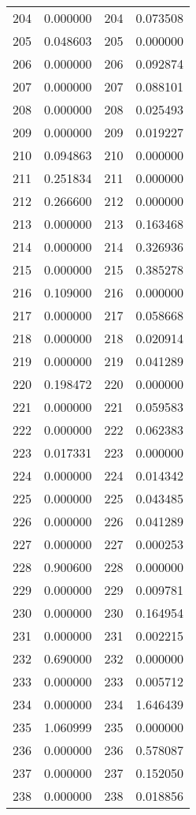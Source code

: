 \documentclass[12pt]{article}
\begin{document}
\begin{longtable}{@{}cccc@{}}
204 & 0.000000 & 204 & 0.073508 \\
205 & 0.048603 & 205 & 0.000000 \\
206 & 0.000000 & 206 & 0.092874 \\
207 & 0.000000 & 207 & 0.088101 \\
208 & 0.000000 & 208 & 0.025493 \\
209 & 0.000000 & 209 & 0.019227 \\
210 & 0.094863 & 210 & 0.000000 \\
211 & 0.251834 & 211 & 0.000000 \\
212 & 0.266600 & 212 & 0.000000 \\
213 & 0.000000 & 213 & 0.163468 \\
214 & 0.000000 & 214 & 0.326936 \\
215 & 0.000000 & 215 & 0.385278 \\
216 & 0.109000 & 216 & 0.000000 \\
217 & 0.000000 & 217 & 0.058668 \\
218 & 0.000000 & 218 & 0.020914 \\
219 & 0.000000 & 219 & 0.041289 \\
220 & 0.198472 & 220 & 0.000000 \\
221 & 0.000000 & 221 & 0.059583 \\
222 & 0.000000 & 222 & 0.062383 \\
223 & 0.017331 & 223 & 0.000000 \\
224 & 0.000000 & 224 & 0.014342 \\
225 & 0.000000 & 225 & 0.043485 \\
226 & 0.000000 & 226 & 0.041289 \\
227 & 0.000000 & 227 & 0.000253 \\
228 & 0.900600 & 228 & 0.000000 \\
229 & 0.000000 & 229 & 0.009781 \\
230 & 0.000000 & 230 & 0.164954 \\
231 & 0.000000 & 231 & 0.002215 \\
232 & 0.690000 & 232 & 0.000000 \\
233 & 0.000000 & 233 & 0.005712 \\
234 & 0.000000 & 234 & 1.646439 \\
235 & 1.060999 & 235 & 0.000000 \\
236 & 0.000000 & 236 & 0.578087 \\
237 & 0.000000 & 237 & 0.152050 \\
238 & 0.000000 & 238 & 0.018856 \\

\end{longtable}
\end{document}
